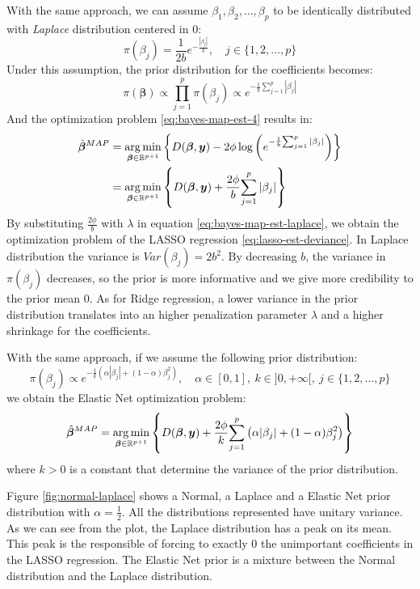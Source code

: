 \documentclass[a4paper, nobind]{templates/ociamthesis}
\theoremstyle{definition}
\theoremstyle{definition}
\theoremstyle{definition}
\theoremstyle{remark}
\begin{document}
With the same approach, we can assume \(\beta_1, \beta_2, \dots, \beta_p\) to be identically distributed with \emph{Laplace} distribution centered in \(0\):
\[
\pi(\beta_j) = \frac{1}{2b}e^{-\frac{|\beta_j|}{b}}, \quad j\in\{1,2,\dots,p\}
\]
Under this assumption, the prior distribution for the coefficients becomes:
\begin{equation}
\label{eq:bayes-glm-prior-laplace}
\pi(\boldsymbol{\beta}) \propto \prod_{j=1}^{p}{\pi(\beta_j)} \propto e^{-\frac{1}{b}{\sum_{j=1}^{p}{|\beta_j|}}} 
\end{equation}
And the optimization problem \eqref{eq:bayes-map-est-4} results in:
\begin{align}
\nonumber
\hat{\boldsymbol{\beta}}^{MAP} & =
\operatorname*{arg\,min}_{\boldsymbol{\beta}\in\mathbb{R}^{p+1}}{\left\{
D(\boldsymbol{\beta}, \boldsymbol{y}) -2\phi \log{\left(e^{-\frac{1}{b}{\sum_{j=1}^{p}{|\beta_j|}}}\right)} \right\}}  \\
\label{eq:bayes-map-est-laplace}
& = \operatorname*{arg\,min}_{\boldsymbol{\beta}\in\mathbb{R}^{p+1}}{\left\{
D(\boldsymbol{\beta}, \boldsymbol{y}) + \frac{2\phi}{b} {\sum_{j=1}^{p}{|\beta_j|}}\right\}}
\end{align}
By substituting \(\frac{2\phi}{b}\) with \(\lambda\) in equation \eqref{eq:bayes-map-est-laplace}, we obtain the optimization problem of the LASSO regression \eqref{eq:lasso-est-deviance}. In Laplace distribution the variance is \(Var(\beta_j) = 2b^2\). By decreasing \(b\), the variance in \(\pi(\beta_j)\) decreases, so the prior is more informative and we give more credibility to the prior mean \(0\). As for Ridge regression, a lower variance in the prior distribution translates into an higher penalization parameter \(\lambda\) and a higher shrinkage for the coefficients.

With the same approach, if we assume the following prior distribution:
\[
\pi(\beta_j) \propto e^{-\frac{1}{k}\left(\alpha|\beta_j| + (1-\alpha)\beta_j^2\right)}, \quad \alpha\in[0,1], \ k\in]0,+\infty[, \ j\in\{1,2,\dots,p\}
\]
we obtain the Elastic Net optimization problem:
\[
\hat{\boldsymbol{\beta}}^{MAP} = \operatorname*{arg\,min}_{\boldsymbol{\beta}\in\mathbb{R}^{p+1}}{\left\{
D(\boldsymbol{\beta}, \boldsymbol{y}) + \frac{2\phi}{k} {\sum_{j=1}^{p}{\left(\alpha|\beta_j| + (1-\alpha)\beta_j^2\right)}}\right\}}
\]
where \(k>0\) is a constant that determine the variance of the prior distribution.

Figure \ref{fig:normal-laplace} shows a Normal, a Laplace and a Elastic Net prior distribution with \(\alpha=\frac{1}{2}\). All the distributions represented have unitary variance. As we can see from the plot, the Laplace distribution has a peak on its mean. This peak is the responsible of forcing to exactly \(0\) the unimportant coefficients in the LASSO regression. The Elastic Net prior is a mixture between the Normal distribution and the Laplace distribution.
\end{document}
